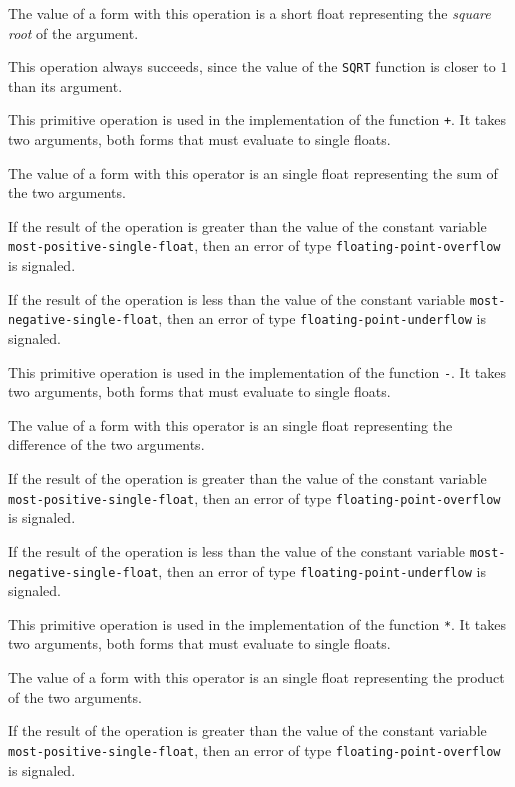 The value of a form with this operation is a short float representing
the \emph{square root} of the argument.

This operation always succeeds, since the value of the \texttt{SQRT}
function is closer to $1$ than its argument.


This primitive operation is used in the implementation of the
\commonlisp{} function \texttt{+}.  It takes two arguments, both forms
that must evaluate to single floats.

The value of a form with this operator is an single float
representing the sum of the two arguments.

If the result of the operation is greater than the value of the
constant variable \texttt{most-positive-single-float}, then an error of
type \texttt{floating-point-overflow} is signaled.

If the result of the operation is less than the value of the
constant variable \texttt{most-negative-single-float}, then an error of
type \texttt{floating-point-underflow} is signaled.


This primitive operation is used in the implementation of the
\commonlisp{} function \texttt{-}.  It takes two arguments, both forms
that must evaluate to single floats.

The value of a form with this operator is an single float
representing the difference of the two arguments.

If the result of the operation is greater than the value of the
constant variable \texttt{most-positive-single-float}, then an error of
type \texttt{floating-point-overflow} is signaled.

If the result of the operation is less than the value of the
constant variable \texttt{most-negative-single-float}, then an error of
type \texttt{floating-point-underflow} is signaled.


This primitive operation is used in the implementation of the
\commonlisp{} function \texttt{*}.  It takes two arguments, both forms
that must evaluate to single floats.

The value of a form with this operator is an single float
representing the product of the two arguments.

If the result of the operation is greater than the value of the
constant variable \texttt{most-positive-single-float}, then an error of
type \texttt{floating-point-overflow} is signaled.

